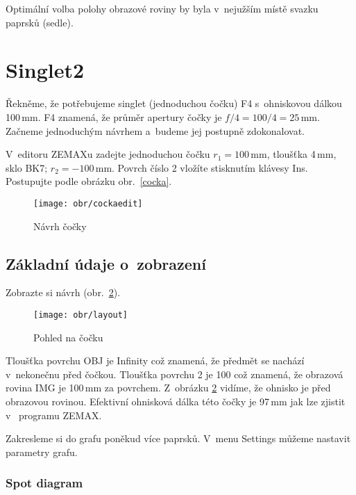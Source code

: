 Optimální volba polohy obrazové roviny by byla v~nejužším místě svazku paprsků
(sedle).

\section{Singlet2}
\label{singlet2}

Řekněme, že potřebujeme singlet (jednoduchou čočku) F4 s~ohniskovou dálkou
100\,mm. F4 znamená, že průměr apertury čočky je $f/4=100/4=25$\,mm. Začneme
jednoduchým návrhem a~budeme jej postupně zdokonalovat.

V~editoru ZEMAXu   zadejte jednoduchou čočku $r_1=100$\,mm, tloušťka 4\,mm,
sklo BK7; $r_2=-100$\,mm. Povrch číslo 2 vložíte stisknutím klávesy Ins.
Postupujte podle obrázku obr.~\ref{cocka}.
%
%
\begin{figure}[htb]
\begin{center}
   \texttt{[image: obr/cockaedit]}
\end{center}
\caption{Návrh čočky}
\label{cocka2}
\end{figure}
%
%

\subsection{Základní údaje o~zobrazení}
\label{sing-zakludaje2}

Zobrazte si návrh (obr.~\ref{sing-layout2}).
%
%
\begin{figure}[htb]
\begin{center}
   \texttt{[image: obr/layout]}
\end{center}
\caption{Pohled na čočku}
\label{sing-layout2}
\end{figure}
%
%
Tloušťka povrchu OBJ je Infinity což znamená, že předmět se nachází v~nekonečnu
před čočkou. Tloušťka povrchu 2 je 100 což znamená, že obrazová rovina IMG je
100\,mm za povrchem. Z~obrázku \ref{sing-layout2} vidíme, že ohnisko je před
obrazovou rovinou. Efektivní ohnisková dálka této čočky je 97\,mm jak lze
zjistit v~ programu ZEMAX.

Zakresleme si do grafu poněkud více paprsků. V~menu Settings můžeme nastavit
parametry grafu.


\subsubsection{Spot diagram}
\label{sing-spotsub2}

